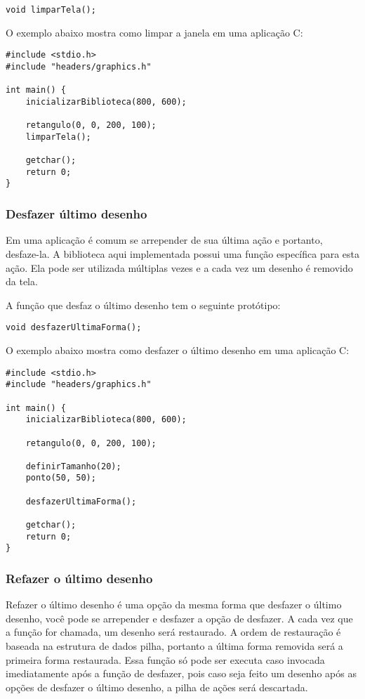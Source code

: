 \documentclass[12pt, %
openright,
oneside, %
a4paper,    %
brazil]{facom-ufu-abntex2}
\begin{document}
\begin{lstlisting}
void limparTela();
\end{lstlisting}

O exemplo abaixo mostra como limpar a janela em uma aplicação C:

\begin{lstlisting}
#include <stdio.h>
#include "headers/graphics.h"

int main() {
    inicializarBiblioteca(800, 600);

    retangulo(0, 0, 200, 100);
    limparTela();

    getchar();
    return 0;
}
\end{lstlisting}

\subsubsection{Desfazer último desenho}
Em uma aplicação é comum se arrepender de sua última ação e portanto, desfaze-la. A biblioteca aqui implementada possui uma função específica para esta ação. Ela pode ser utilizada múltiplas vezes e a cada vez um desenho é removido da tela.

A função que desfaz o último desenho tem o seguinte protótipo:

\begin{lstlisting}
void desfazerUltimaForma();
\end{lstlisting}

O exemplo abaixo mostra como desfazer o último desenho em uma aplicação C:

\begin{lstlisting}
#include <stdio.h>
#include "headers/graphics.h"

int main() {
    inicializarBiblioteca(800, 600);

    retangulo(0, 0, 200, 100);
    
    definirTamanho(20);
    ponto(50, 50);
    
    desfazerUltimaForma();

    getchar();
    return 0;
}
\end{lstlisting}

\subsubsection{Refazer o último desenho}
Refazer o último desenho é uma opção da mesma forma que desfazer o último desenho, você pode se arrepender e desfazer a opção de desfazer. A cada vez que a função for chamada, um desenho será restaurado. A ordem de restauração é baseada na estrutura de dados pilha, portanto a última forma removida será a primeira forma restaurada. Essa função só pode ser executa caso invocada imediatamente após a função de desfazer, pois caso seja feito um desenho após as opções de desfazer o último desenho, a pilha de ações será descartada.
\end{document}
